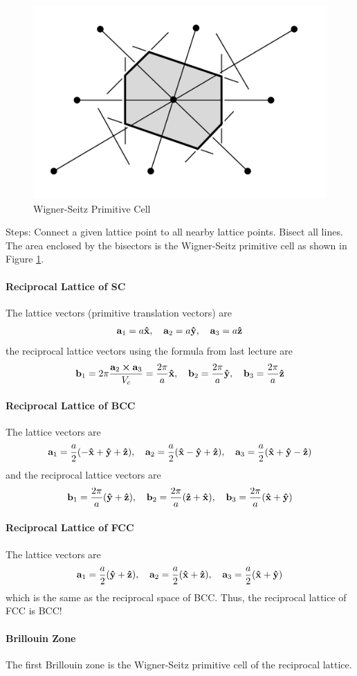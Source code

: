 \documentclass[../main.tex]{subfiles}
\begin{document}
\begin{figure}[ht]
    \centering
    \includegraphics[width=0.4\linewidth]{pcell.png}
    \caption{Wigner-Seitz Primitive Cell}
    \label{fig:3.1}
\end{figure}
Steps: Connect a given lattice point to all nearby lattice points. Bisect all lines. The area 
enclosed by the bisectors is the Wigner-Seitz primitive cell as shown in Figure \ref{fig:3.1}.

\paragraph{Reciprocal Lattice of SC} The lattice vectors (primitive translation vectors) are
\begin{align*}
    \vb{a}_1 = a\vu{x}, \quad \vb{a}_2 = a\vu{y}, \quad \vb{a}_3 = a\vu{z}
\end{align*}
the reciprocal lattice vectors using the formula from last lecture are
\begin{align*}
    \vb{b}_1 = 2\pi \frac{\vb{a}_2 \cross \vb{a}_3}{V_c} = \frac{2\pi}{a}\vu{x}, \quad
    \vb{b}_2 = \frac{2\pi}{a}\vu{y}, \quad \vb{b}_3 = \frac{2\pi}{a}\vu{z}
\end{align*}

\paragraph{Reciprocal Lattice of BCC} The lattice vectors are
\begin{align*}
    \vb{a}_1 = \frac{a}{2}(-\vu{x} + \vu{y} + \vu{z}), \quad
    \vb{a}_2 = \frac{a}{2}(\vu{x} - \vu{y} + \vu{z}), \quad
    \vb{a}_3 = \frac{a}{2}(\vu{x} + \vu{y} - \vu{z})
\end{align*}
and the reciprocal lattice vectors are
\begin{align*}
    \vb{b}_1 = \frac{2\pi}{a}(\vu{y} + \vu{z}), \quad
    \vb{b}_2 = \frac{2\pi}{a}(\vu{z} + \vu{x}), \quad
    \vb{b}_3 = \frac{2\pi}{a}(\vu{x} + \vu{y})
\end{align*}

\paragraph{Reciprocal Lattice of FCC} The lattice vectors are
\begin{align*}
    \vb{a}_1 = \frac{a}{2}(\vu{y} + \vu{z}), \quad
    \vb{a}_2 = \frac{a}{2}(\vu{x} + \vu{z}), \quad
    \vb{a}_3 = \frac{a}{2}(\vu{x} + \vu{y})
\end{align*}
which is the same as the reciprocal space of BCC. Thus, the reciprocal lattice of FCC is BCC!

\paragraph{Brillouin Zone} The first Brillouin zone is the Wigner-Seitz primitive cell of the
reciprocal lattice.
\end{document}
